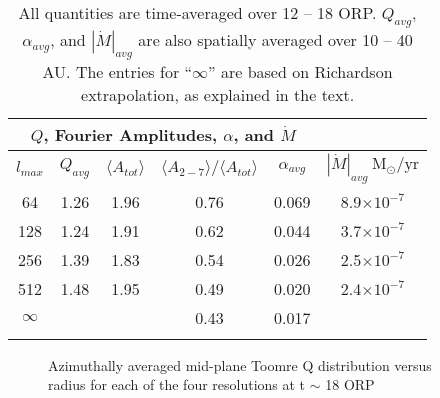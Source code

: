 \documentclass[manuscript]{aastex}
\begin{document}
\begin{table}
\begin{center}
\begin{tabular}{cccccc}
\multicolumn{5}{c}{$Q$, Fourier Amplitudes, $\alpha$, and $\dot{M}$}\\ \hline\hline
$l_{max}$ & $Q_{avg}$   & $\langle A_{tot} \rangle$   & $\langle A_{2-7} \rangle / \langle A_{tot} \rangle$ &
$\alpha_{avg}$ & $|\dot{M}|_{avg} ~\mathrm{M_\odot/yr}$\\\hline
64   & 1.26 & 1.96 &  0.76 & 0.069 & 8.9$ \times 10^{-7}$ \\
128 & 1.24 & 1.91 &  0.62 & 0.044 & 3.7$ \times 10^{-7}$ \\
256 & 1.39 & 1.83 &  0.54 & 0.026 & 2.5$ \times 10^{-7}$ \\
512 & 1.48 & 1.95 &  0.49 & 0.020 & 2.4$ \times 10^{-7}$ \\ 
$\infty$ & & &0.43 & 0.017 & \\ \hline
\label{tbl:ams}
\end{tabular}
\caption{ All quantities are time-averaged over 12 -- 18 ORP.
$Q_{avg}$, $\alpha_{avg}$, and $|\dot{M}|_{avg}$  are also spatially
averaged over 10 -- 40 AU.  The entries for ``$\infty$'' are based on Richardson extrapolation,
as explained in the text.}  
\end{center}
\end{table}





\newpage

\begin{figure}
\caption{Azimuthally averaged mid-plane Toomre Q distribution versus radius for each of the four resolutions at t $\sim$ 18 ORP}
\label{fig:Final_Q}
\end{figure}
\end{document}

